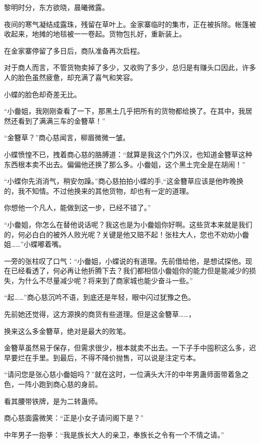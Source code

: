 
\begin{this_body}

黎明时分，东方欲晓，晨曦微露。

夜间的寒气凝结成露珠，残留在草叶上。金家寨临时的集市，正在被拆除。帐篷被收起来，地摊的地毯被一一卷起。货物包扎好，重新装上。

在金家寨停留了多日后，商队准备再次启程。

对于商人而言，不管货物卖掉了多少，又收购了多少，总归是有赚头口因此，许多人的脸色虽然疲惫，却充满了喜气和笑容。

小蝶的脸色却奇差无比。

“小齤姐，我刚刚查看了一下，那黑土几乎把所有的货物都给换了。在其中，我居然还看到了满满三车的金簪草！”

“金簪草？”商心慈闻言，柳眉微微一皱。

小蝶愤惶不已，拽着商心慈的胳膊道：“就算是我这个门外汉，也知道金簪草这种东西根本卖不出去。偏偏他还换了那么多。小齤姐，这个黑土完全是在胡闹！”

“小蝶你先消消气，稍安勿躁。”商心慈拍拍小蝶的手,“这金簪草应该是他昨晚换的，我不知情。不过他换来的其他货物，却也有一定的道理。

你想他一个凡人，能做到这一步，已经不错了。”

“小齤姐，你怎么在替他说话呢？我这也是为小齤姐你好啊。这些货本来就是我们的，何必白白的被外人败光呢？关键是他又赔不起！张柱大人，您也不劝劝小齤姐……”小蝶嘟着嘴。

一旁的张柱叹了口气：“小齤姐，小蝶说的有道理。先前借给他，是想试探他。现在已经看透了，何必再让他折腾下去？我们都相信小齤姐你的能力但是能减少的损失，为什么不尽量减少呢？将来到了商家城也能少奋斗一些。”

“起……”商心慈沉吟不语，到底还是年轻，眼中闪过犹豫之色。

先前她还觉得，这方源换的商货有些道理。但是这金簪草……，

换来这么多金簪草，绝对是最大的败笔。

金簪草虽然易于保存，但需求很少，根本就卖不出去。一下子手中囤积这么多，迟早要烂在手里。到最后，不得不降价抛售，可以说是注定亏本。

“请问您是张心慈小齤姐吗？”就在这时，一位满头大汗的中年男蛊师面带着急之色，一阵小跑到商心慈的身前。

看其腰带铁牌，是为二转蛊师。

商心慈面露微笑：“正是小女子请问阁下是？”

中年男子一抱拳：“我是族长大人的亲卫，奉族长之令有一个不情之请。”


\end{this_body}
